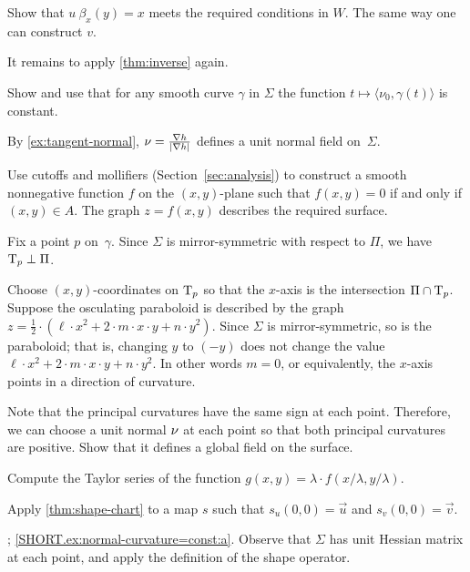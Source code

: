 \begin{multicols}{2}
Show that $u\:\beta_x(y)= x$ meets the required conditions in $W$.
The same way one can construct $v$.

It remains to apply \ref{thm:inverse} again.

Show and use that for any smooth curve $\gamma$ in $\Sigma$ the function $t\mapsto \langle\nu_0,\gamma(t)\rangle$ is constant.

By \ref{ex:tangent-normal}, $\nu=\tfrac{\nabla h}{|\nabla h|}$ defines a unit normal field on~$\Sigma$.

Use cutoffs and mollifiers (Section~\ref{sec:analysis}) to construct a smooth nonnegative function $f$ on the $(x,y)$-plane such that $f(x,y)=0$ if and only if $(x,y)\in A$.
The graph $z=f(x,y)$ describes the required surface.


\setcounter{eqtn}{0}

Fix a point $p$ on~$\gamma$.
Since $\Sigma$ is mirror-symmetric with respect to $\Pi$,
we have $\mathrm{T}_p\perp \Pi$.

Choose $(x,y)$-coordinates on $\mathrm{T}_p$ so that the $x$-axis is the intersection $\Pi\cap \mathrm{T}_p$.
Suppose the osculating paraboloid is described by the graph 
$z=\tfrac12\cdot(\ell\cdot x^2+2\cdot m\cdot x\cdot y+n\cdot y^2)$.
Since $\Sigma$ is mirror-symmetric, so is the paraboloid;
that is, changing $y$ to $(-y)$ does not change the value 
$\ell\cdot x^2+2\cdot m\cdot x\cdot y+n\cdot y^2$.
In other words $m=0$, or equivalently, the $x$-axis points in a direction of curvature.

 Note that the principal curvatures have the same sign at each point.
Therefore, we can choose a unit normal $\nu$ at each point so that both principal curvatures are positive.
Show that it defines a global field on the surface.


 Compute the Taylor series of the function $g(x,y)= \lambda \cdot f( x/ \lambda , y/\lambda)$.


Apply \ref{thm:shape-chart} to a map $s$ such that $s_u(0,0)=\vec u$ and $s_v(0,0)=\vec v$.

\parbf{\ref{ex:normal-curvature=const}}; \ref{SHORT.ex:normal-curvature=const:a}.
Observe that $\Sigma$ has unit Hessian matrix at each point, and apply the definition of the shape operator.


\end{multicols}
